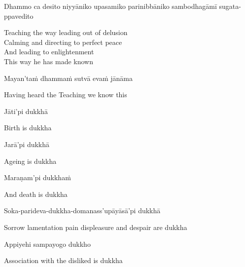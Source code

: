\begin{pali-hang}
  Dhammo ca desito niyyāniko upasamiko parinibbāniko sambodhagāmī sugata-ppavedito
\end{pali-hang}

\begin{english-verses}
  Teaching the way leading out of delusion\makeatletter\hyperlink{endnote13-appendix}\makeatother\\
  Calming and directing to perfect peace\\
  And leading to enlightenment\\
  This way he has made known\\
\end{english-verses}

Mayan'taṁ dhammaṁ sutvā evaṁ jānāma

\begin{english}
  Having heard the Teaching we know this
\end{english}

\suttaRef{[Thai]}

Jāti'pi dukkhā

\begin{english}
  Birth is dukkha
\end{english}

Jarā'pi dukkhā

\begin{english}
  Ageing is dukkha
\end{english}

Maraṇam'pi dukkhaṁ

\begin{english}
  And death is dukkha
\end{english}

Soka-parideva-dukkha-domanass'upāyāsā'pi dukkhā

\begin{english}
  Sorrow lamentation pain displeasure\ifdigitalversion\makeatletter\hyperlink{endnote14-appendix}\makeatother\fi
  and despair are dukkha
\end{english}

Appiyehi sampayogo dukkho

\begin{english}
  Association with the disliked is dukkha
\end{english}

